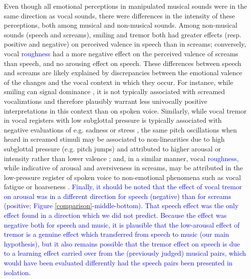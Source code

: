 \documentclass[openacc]{rsprocb_new}%
\begin{document}
Even  though  all  emotional  perceptions  in  manipulated  musical  sounds  were  in  the  same direction  as  vocal  sounds, there  were  differences  in  the  intensity  of  these perceptions, both among  musical and non-musical sounds. Among non-musical sounds (speech and screams), smiling and tremor both had greater effects (resp. positive and negative) on perceived valence in speech than in screams; conversely, vocal \textcolor{blue}{roughness} had a more negative effect on the perceived valence of screams than speech, and no arousing effect on speech. These differences between speech and screams are likely explained by discrepancies between the emotional valence of the changes and the vocal context in which they occur. For instance, while smiling can signal dominance \cite{RYCH17}, it is not typically associated with screamed vocalizations and therefore plausibly warrant less univocally positive interpretations in this context than on spoken voice. Similarly, while vocal tremor in vocal registers with low subglottal pressure is typically associated with negative evaluations of e.g. sadness or stress \cite{GID13,RACH17}, the same pitch oscillations when heard in screamed stimuli may be associated to non-linearities due to high subglottal pressure (e.g. pitch jumps) and attributed to higher arousal or intensity rather than lower valence \cite{ANI20-2}; and, in a similar manner, vocal \textcolor{blue}{roughness}, while indicative of arousal and aversiveness in screams, may be attributed in the low-pressure register of spoken voice to non-emotional phenomena such as vocal fatigue or hoarseness \cite{LAUK08,ANIK20}. \textcolor{blue}{Finally, it should be noted that the effect of vocal tremor on arousal was in a different direction for speech (negative) than for screams (positive; Figure \ref{comparison}-middle-bottom). That speech effect was the only effect found in a direction which we did not predict. Because the effect was negative both for speech and music, it is plausible that the low-arousal effect of tremor is a genuine effect which transferred from speech to music (our main hypothesis), but it also remains possible that the tremor effect on speech is due to a learning effect carried over from the (previously judged) musical pairs, which would have been evaluated differently had the speech pairs been presented in isolation}. 

\end{document}
